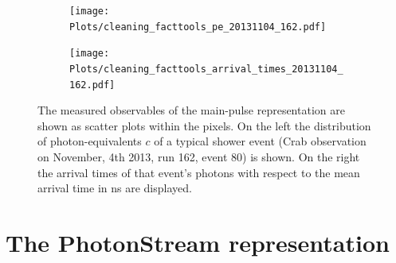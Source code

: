 \begin{figure}
  \begin{subfigure}{0.475\textwidth}
    \texttt{[image: Plots/cleaning\_facttools\_pe\_20131104\_162.pdf]}
  \end{subfigure}
  \begin{subfigure}{0.475\textwidth}
    \texttt{[image: Plots/cleaning\_facttools\_arrival\_times\_20131104\_162.pdf]}
  \end{subfigure}
  \caption{The measured observables of the main-pulse representation are shown as scatter plots within the pixels. On the left the distribution of photon-equivalents $c$ of a typical shower event (Crab observation on November, 4th 2013, run 162, event 80) is shown. On the right the arrival times of that event's photons with respect to the mean arrival time in ns are displayed.}
  \label{fig:mainpulse}
\end{figure}

\section{The PhotonStream representation}

